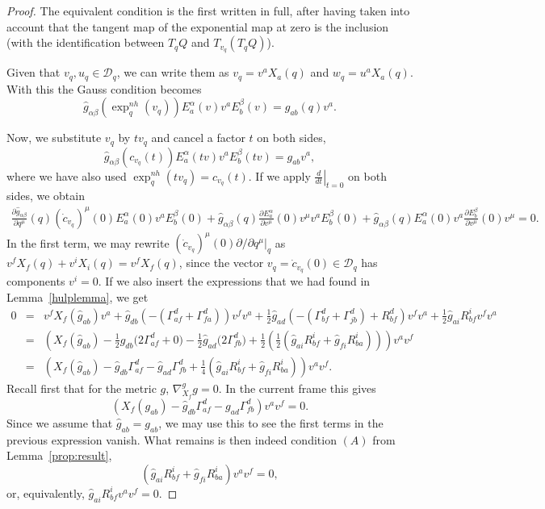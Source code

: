 \documentclass[11pt]{article}
\begin{document}
\begin{proof} 
The equivalent condition is the first written in full, after having taken into account that the tangent map of the exponential map {at} zero is the inclusion (with the identification between $T_q Q$ and $T_{v_q}(T_q Q)$).

Given that  $v_q,u_q\in\mathcal{D}_q$, we can write them as  $v_q=v^a X_a(q)$ and $w_q=u^a X_a(q)$. With this the Gauss condition becomes
$$
\hat{g}_{\alpha\beta}(\exp^{nh}_q(v_q)){E_a^\alpha(v)} v^a E_b^\beta(v)=g_{a b}(q) v^a.
$$

Now, we substitute $v_q$ by $t v_q$ and cancel a factor $t$ on both sides, 
$$
 \hat{g}_{{\alpha\beta}}(c_{v_q}(t))E_a^\alpha(tv)v^a E_b^\beta(t v)=g_{a b} v^a,
$$
where we have also used $\exp^{nh}_q(tv_q)=c_{v_q}(t)$.
If we apply $\left.\frac{d}{d t}\right|_{t=0}$ on both sides, we obtain 
\begin{eqnarray*}
    \frac{\partial \hat{g}_{\alpha\beta}}{\partial q^\mu}(q)(\dot{c}_{v_q})^\mu(0) {E_a^\alpha(0)} v^a {E_b^\beta(0)} +\hat{g}_{{\alpha\beta}}(q) \frac{\partial E_a^\alpha}{\partial v^\mu}(0) v^\mu v^a {E_b^\beta(0)} +\hat{g}_{{\alpha\beta}}(q)  {E_a^\alpha(0)} v^a \frac{\partial E_b^\beta}{\partial v^\mu}(0) v^\mu=0.
\end{eqnarray*}
In the first term, we may rewrite $(\dot{c}_{v_q})^\mu(0){\partial}/{\partial q^\mu}|_q$ as $v^f X_f(q)+v^i X_i(q)=v^f X_f (q)$, since the vector   $v_q = {\dot c}_{v_q}(0)\in\mathcal{D}_q$ has components $v^i=0$. If we also insert the expressions that we had found in Lemma~\ref{hulplemma}, we get
\begin{eqnarray*}
    0 
     &=& v^f X_f(\hat{g}_{ab})v^a+\hat{g}_{{d b}}\left( -(\Gamma^d_{af}+\Gamma_{fa}^d)\right) v^f v^a+ \frac{1}{2}\hat{g}_{{ad}}\left( -(\Gamma^d_{bf}+\Gamma^d_{jb})+R^d_{bf}\right) v^f v^a+
   \frac{1}{2}\hat{g}_{{ai}}R^i_{bf}v^f v^a
	\\
   &=&  \left( X_f(\hat{g}_{ab})-\frac{1}{2}\hat{g}_{{d b}}\big(2\Gamma^d_{af}+0\big)-\frac{1}{2}\hat{g}_{{ad}}\big(2\Gamma^d_{fb}\big)+
   \frac{1}{2}(\frac{1}{2}(\hat{g}_{ai}R^i_{bf}+\hat{g}_{fi}R^i_{ba}))\right)v^av^f\\
   &=& \left(X_f(\hat{g}_{ab})-\hat{g}_{db}\Gamma^d_{af}-\hat{g}_{ad}\Gamma^d_{fb}+\frac{1}{4}(\hat{g}_{ai}R^i_{bf}+\hat{g}_{fi}R^i_{ba})\right)v^av^f.
\end{eqnarray*}
Recall first that for the metric $g$, $\nabla^g_{X_f}g=0$. In the current frame this gives 
 $$
\left(X_f({g}_{ab})-\hat{g}_{db}\Gamma^d_{af}-{g}_{ad}\Gamma^d_{fb}\right)v^a v^f =0.
$$
Since we assume that $\hat{g}_{ab}=g_{ab}$, we may use this to see  the first terms in the previous expression  vanish. What remains is then indeed condition $(A)$ from Lemma~\ref{prop:result}, 
$$
\left(\hat{g}_{ai}R^i_{bf}+\hat{g}_{fi}R^i_{ba}\right)v^av^f=0,
$$
or, equivalently,
$
\hat{g}_{ai}R^i_{bf}v^av^f=0$.
\end{proof}
\end{document}
